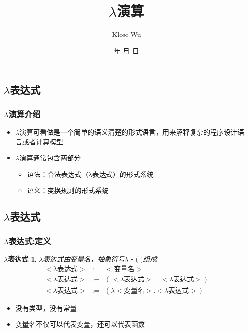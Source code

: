 \documentclass[CJKutf8,compress,hyperref]{beamer}
\renewcommand{\today}{\number\year 年 \number\month 月 \number\day 日}
\begin{document}
\begin{CJK}{UTF8}{song}
 
\title{$\lambda$演算}
\author{Klose Wu}
\date{ \today}

\frame{\titlepage}
\tableofcontents
\section{$\lambda$表达式}

\begin{frame}
  \frametitle{$\lambda$演算介绍}
  \begin{itemize}
  \item $\lambda$演算可看做是一个简单的语义清楚的形式语言，用来解释复杂的程序设计语言或者计算模型
  \item $\lambda$演算通常包含两部分
    \begin{itemize} 
    \item{语法}：合法表达式（{\color{red}$\lambda$}表达式）的形式系统
    \item{语义}：变换规则的形式系统
    \end{itemize}
  \end{itemize}
\end{frame}

\subsection{ $\lambda$表达式}

\begin{frame}
  \frametitle{$\lambda$表达式:定义}
  \newtheorem{LE}{$\lambda$表达式} 
  \begin{LE}
    $\lambda$表达式由变量名，抽象符号$\lambda$  $\centerdot$  $($  $)$组成 
    \begin{eqnarray*}
      <\textrm{$\lambda$表达式}> & := & <\textrm{变量名}> \\
      <\textrm{$\lambda$表达式}> & := & (<\textrm{$\lambda$表达式}>\quad<\textrm{$\lambda$表达式}>) \\ 
      <\textrm{$\lambda$表达式}> & := & (\lambda<\textrm{变量名}>.<\textrm{$\lambda$表达式}>)  
    \end{eqnarray*} 
  \end{LE}      
  \begin{itemize}
  \item 没有类型，没有常量 
  \item 变量名不仅可以代表变量，还可以代表{\color{red}函数}
  \end{itemize}
\end{frame}


\end{CJK}
\end{document}
